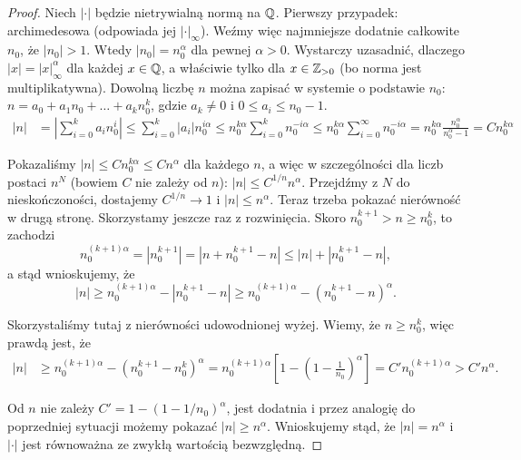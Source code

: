 \begin{proof}
	Niech $|\cdot|$ będzie nietrywialną normą na $\mathbb{Q}$.
	Pierwszy przypadek: archimedesowa (odpowiada jej $|\cdot|_\infty$).
	Weźmy więc najmniejsze dodatnie całkowite $n_0$, że $|n_0| > 1$.
	Wtedy $|n_0| = n_0^\alpha$ dla pewnej $\alpha > 0$.
	Wystarczy uzasadnić, dlaczego $|x| = |x|_\infty^\alpha$ dla każdej $x \in \mathbb{Q}$, a właściwie tylko dla $x \in \mathbb{Z}_{>0}$ (bo norma jest multiplikatywna).
	Dowolną liczbę $n$ można zapisać w systemie o podstawie $n_0$: $n = a_0 + a_1 n_0 + \dots + a_kn_0^k$, gdzie $a_k \neq 0$ i $0 \le a_i \le n_0-1$.
	\begin{align*}
	|n| & = \left|\sum_{i=0}^k a_in_0^i\right| \le \sum_{i=0}^k \left|a_i\right| n_0^{i \alpha} \le n_0^{k \alpha} \sum_{i = 0}^k n_0^{-i \alpha} \le n_0^{k \alpha} \sum_{i = 0}^\infty n_0^{-i \alpha} = n_0^{k \alpha} \frac{n_0^\alpha}{n_0^\alpha - 1} = C n_0^{k \alpha}
	\end{align*}

	Pokazaliśmy $|n| \le Cn_0^{k \alpha} \le C n^\alpha$ dla każdego $n$, a więc w szczególności dla liczb postaci $n^N$ (bowiem $C$ nie zależy od $n$): $|n| \le C^{1/n}n^\alpha$.
	Przejdźmy z $N$ do nieskończoności, dostajemy $C^{1/n} \to 1$ i $|n| \le n^\alpha$.
	Teraz trzeba pokazać nierówność w drugą stronę.
	Skorzystamy jeszcze raz z rozwinięcia.
	Skoro $n_0^{k+1} > n \ge n_0^k$, to zachodzi
	\[
		n_0^{(k+1)\alpha} = |n_0^{k+1}| = |n+n_0^{k+1} - n| \le |n| + |n_0^{k+1} - n|,
	\]
	a stąd wnioskujemy, że 
	\[
		|n| \ge n_0^{(k+1)\alpha} - |n_0^{k+1}-n| \ge n_0^{(k+1)\alpha} - (n_0^{k+1}-n)^\alpha.
	\]

	Skorzystaliśmy tutaj z nierówności udowodnionej wyżej.
	Wiemy, że $n \ge n_0^k$, więc prawdą jest, że
	\begin{align*}
		|n| & \ge n_0^{(k+1)\alpha} - (n_0^{k+1} - n_0^k)^\alpha = n_0^{(k+1) \alpha} [1 - (1 - \textstyle \frac{1}{n_0})^\alpha]  = C' n_0^{(k+1)\alpha} > C' n^\alpha.
	\end{align*}

	Od $n$ nie zależy $C' = 1 - (1-1/n_0)^\alpha$, jest dodatnia i przez analogię do poprzedniej sytuacji możemy pokazać $|n| \ge n^\alpha$.
	Wnioskujemy stąd, że $|n| = n^\alpha$ i $|\cdot|$ jest równoważna ze zwykłą wartością bezwzględną.


\end{proof}
